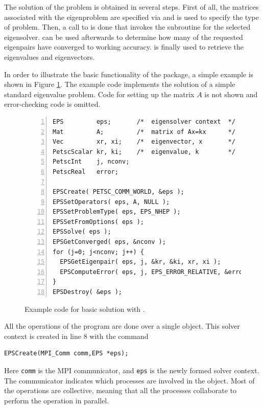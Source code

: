 The solution of the problem is obtained in several steps. First of all, the matrices associated with the eigenproblem are specified via  and  is used to specify the type of problem. Then, a call to  is done that invokes the subroutine for the selected eigensolver.  can be used afterwards to determine how many of the requested eigenpairs have converged to working accuracy.  is finally used to retrieve the eigenvalues and eigenvectors.

In order to illustrate the basic functionality of the  package, a simple example is shown in Figure \ref{fig:ex-eps}. The example code implements the solution of a simple standard eigenvalue problem. Code for setting up the matrix $A$ is not shown and error-checking code is omitted.

\begin{figure}
\begin{Verbatim}[fontsize=\small,numbers=left,numbersep=6pt,xleftmargin=15mm]
EPS         eps;       /*  eigensolver context  */
Mat         A;         /*  matrix of Ax=kx      */
Vec         xr, xi;    /*  eigenvector, x       */
PetscScalar kr, ki;    /*  eigenvalue, k        */
PetscInt    j, nconv;
PetscReal   error;

EPSCreate( PETSC_COMM_WORLD, &eps );
EPSSetOperators( eps, A, NULL );
EPSSetProblemType( eps, EPS_NHEP );
EPSSetFromOptions( eps );
EPSSolve( eps );
EPSGetConverged( eps, &nconv );
for (j=0; j<nconv; j++) {
  EPSGetEigenpair( eps, j, &kr, &ki, xr, xi );
  EPSComputeError( eps, j, EPS_ERROR_RELATIVE, &error );
}
EPSDestroy( &eps );
\end{Verbatim}
\caption{\label{fig:ex-eps}Example code for basic solution with .}
\end{figure}

All the operations of the program are done over a single  object. This solver context is created in line 8 with the command
        \begin{Verbatim}[fontsize=\small]
        EPSCreate(MPI_Comm comm,EPS *eps);
        \end{Verbatim}
Here \texttt{comm} is the MPI communicator, and \texttt{eps} is the newly formed solver context. The communicator indicates which processes are involved in the  object. Most of the  operations are collective, meaning that all the processes collaborate to perform the operation in parallel.

